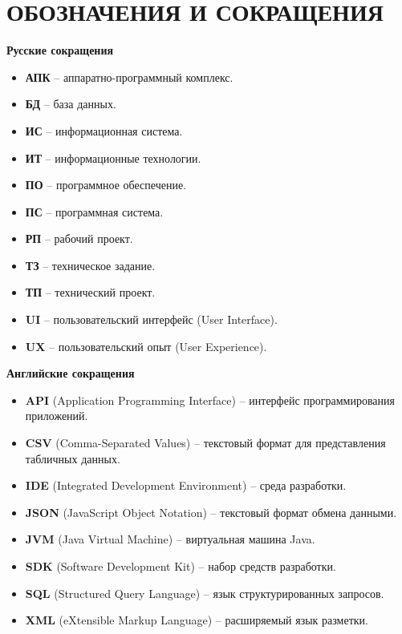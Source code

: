 \section*{ОБОЗНАЧЕНИЯ И СОКРАЩЕНИЯ}

\textbf{Русские сокращения}

\begin{itemize}
	\item \textbf{АПК} – аппаратно-программный комплекс.
	\item \textbf{БД} – база данных.
	\item \textbf{ИС} – информационная система.
	\item \textbf{ИТ} – информационные технологии.
	\item \textbf{ПО} – программное обеспечение.
	\item \textbf{ПС} – программная система.
	\item \textbf{РП} – рабочий проект.
	\item \textbf{ТЗ} – техническое задание.
	\item \textbf{ТП} – технический проект.
	\item \textbf{UI} – пользовательский интерфейс (User Interface).
	\item \textbf{UX} – пользовательский опыт (User Experience).
\end{itemize}

\textbf{Английские сокращения}

\begin{itemize}
	\item \textbf{API} (Application Programming Interface) – интерфейс программирования приложений.
	\item \textbf{CSV} (Comma-Separated Values) – текстовый формат для представления табличных данных.
	\item \textbf{IDE} (Integrated Development Environment) – среда разработки.
	\item \textbf{JSON} (JavaScript Object Notation) – текстовый формат обмена данными.
	\item \textbf{JVM} (Java Virtual Machine) – виртуальная машина Java.
	\item \textbf{SDK} (Software Development Kit) – набор средств разработки.
	\item \textbf{SQL} (Structured Query Language) – язык структурированных запросов.
	\item \textbf{XML} (eXtensible Markup Language) – расширяемый язык разметки.
\end{itemize}

